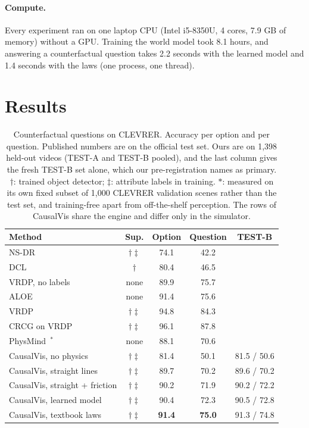 \documentclass[10pt,twocolumn,letterpaper]{article}
\newcommand{\sys}{CausalVis}
\begin{document}
\paragraph{Compute.}
Every experiment ran on one laptop CPU (Intel i5-8350U, 4 cores, 7.9 GB of memory) without a GPU.
Training the world model took 8.1 hours, and answering a counterfactual question takes 2.2 seconds with the learned model and 1.4 seconds with the laws (one process, one thread).

\section{Results}
\label{sec:results}

\begin{table}[tb]
\caption{Counterfactual questions on CLEVRER. Accuracy per option and per question. Published numbers are on the official test set. Ours are on 1,398 held-out videos (TEST-A and TEST-B pooled), and the last column gives the fresh TEST-B set alone, which our pre-registration names as primary. $\dagger$: trained object detector; $\ddagger$: attribute labels in training. $\ast$: measured on its own fixed subset of 1,000 CLEVRER validation scenes rather than the test set, and training-free apart from off-the-shelf perception. The rows of \sys{} share the engine and differ only in the simulator.}
\label{tab:main}
\centering
\small
\setlength{\tabcolsep}{3pt}
\begin{tabular}{@{}lcccc@{}}
\toprule
Method & Sup. & Option & Question & TEST-B \\
\midrule
NS-DR~\cite{yi2020clevrer} & $\dagger\ddagger$ & 74.1 & 42.2 & \\
DCL~\cite{chen2021dcl} & $\dagger$ & 80.4 & 46.5 & \\
VRDP, no labels~\cite{ding2021vrdp} & none & 89.9 & 75.7 & \\
ALOE~\cite{ding2021aloe} & none & 91.4 & 75.6 & \\
VRDP~\cite{ding2021vrdp} & $\dagger\ddagger$ & 94.8 & 84.3 & \\
CRCG on VRDP~\cite{ishay2024crcg} & $\dagger\ddagger$ & 96.1 & 87.8 & \\
PhysMind~\cite{yang2026physmind}$^{\ast}$ & none & 88.1 & 70.6 & \\
\midrule
\sys{}, no physics & $\dagger\ddagger$ & 81.4 & 50.1 & 81.5 / 50.6 \\
\sys{}, straight lines & $\dagger\ddagger$ & 89.7 & 70.2 & 89.6 / 70.2 \\
\sys{}, straight + friction & $\dagger\ddagger$ & 90.2 & 71.9 & 90.2 / 72.2 \\
\sys{}, learned model & $\dagger\ddagger$ & 90.4 & 72.3 & 90.5 / 72.8 \\
\sys{}, textbook laws & $\dagger\ddagger$ & \textbf{91.4} & \textbf{75.0} & 91.3 / 74.8 \\
\bottomrule
\end{tabular}
\end{table}
\end{document}
